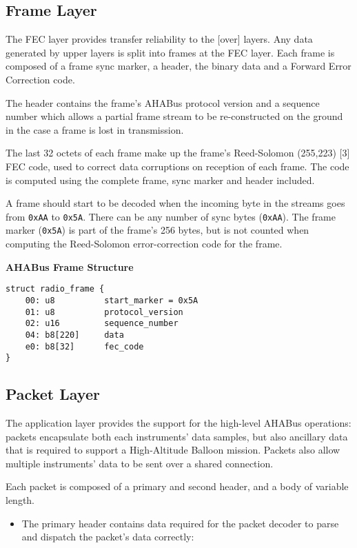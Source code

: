 \begin{appendices}
\subsection{Frame Layer}\label{fec-layer}

The FEC layer provides transfer reliability to the {[}over{]} layers.
Any data generated by upper layers is split into frames at the FEC
layer. Each frame is composed of a frame sync marker, a header, the
binary data and a Forward Error Correction code.

The header contains the frame's AHABus protocol version and a sequence
number which allows a partial frame stream to be re-constructed on the
ground in the case a frame is lost in transmission.

The last 32 octets of each frame make up the frame's Reed-Solomon
(255,223) {[}3{]} FEC code, used to correct data corruptions on
reception of each frame. The code is computed using the complete frame,
sync marker and header included.

A frame should start to be decoded when the incoming byte in the streams
goes from \texttt{0xAA} to \texttt{0x5A}. There can be any number of
sync bytes (\texttt{0xAA}). The frame marker (\texttt{0x5A}) is part of
the frame's 256 bytes, but is not counted when computing the
Reed-Solomon error-correction code for the frame.

\textbf{AHABus Frame Structure}

\begin{verbatim}
struct radio_frame {
    00: u8          start_marker = 0x5A
    01: u8          protocol_version
    02: u16         sequence_number
    04: b8[220]     data
    e0: b8[32]      fec_code
}
\end{verbatim}

\subsection{Packet Layer}\label{application-layer}

The application layer provides the support for the high-level AHABus
operations: packets encapsulate both each instruments' data samples, but
also ancillary data that is required to support a High-Altitude Balloon
mission. Packets also allow multiple instruments' data to be sent over a
shared connection.

Each packet is composed of a primary and second header, and a body of
variable length.

\begin{itemize}
\item
  The primary header contains data required for the packet decoder to
  parse and dispatch the packet's data correctly:


\end{itemize}
\end{appendices}
